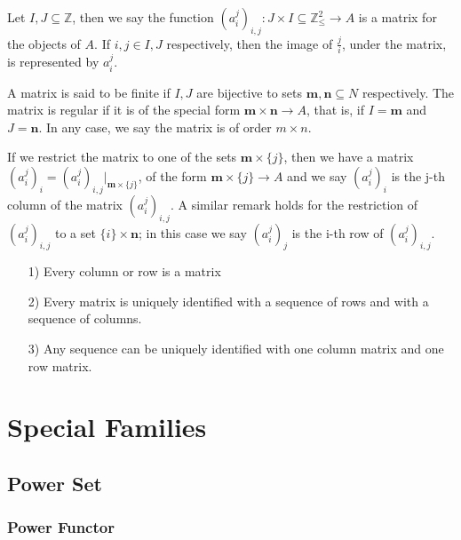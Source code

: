 \documentclass [12pt]{book}
\begin{document}
\begin{definition}Let $I,J\subseteq\mathbb{Z}$, then we say the function $(a_i^j)_{i,j}:J\times I\subseteq\mathbb{Z}^2_\leq\rightarrow A$ is a matrix for the objects of $A$. If $i,j\in I,J$ respectively, then the image of $\frac{j}{i}$, under the matrix, is represented by $a^j_i$.

A matrix is said to be finite if $I,J$ are bijective to sets $\textbf{m},\textbf{n}\subseteq{N}$ respectively. The matrix is regular if it is of the special form $\textbf{m}\times\textbf{n}\rightarrow A$, that is, if $I=\textbf{m}$ and $J=\textbf{n}$. In any case, we say the matrix is of order $m\times n$.

If we restrict the matrix to one of the sets $\textbf{m}\times \{j\}$, then we have a matrix $(a_i^j)_i=(a_i^j)_{i,j}|_{\textbf{m}\times \{j\}}$, of the form $\textbf{m}\times \{j\}\rightarrow A$ and we say $(a_i^j)_i$ is the j-th column of the matrix $(a_i^j)_{i,j}$. A similar remark holds for the restriction of $(a_i^j)_{i,j}$ to a set $\{i\}\times\textbf{n}$; in this case we say $(a_i^j)_j$ is the i-th row of $(a_i^j)_{i,j}$.\end{definition}

\begin{proposition}\makebox[5pt][]{}\mbox {}
\begin{itemize}\item[1)]Every column or row is a matrix\item[2)]Every matrix is uniquely identified with a sequence of rows and with a sequence of columns.\item[3)]Any sequence can be  uniquely identified with one column matrix and one row matrix.\end{itemize}\end{proposition}


\section{Special Families}

	\subsection{Power Set}

		\subsubsection{Power Functor} 
\end{document}
